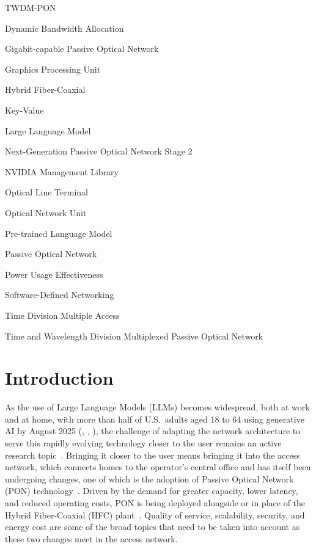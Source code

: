 \documentclass[cic,dipl,english]{infufrgs}
\begin{document}
\begin{listofabbrv}{TWDM-PON}
  \item[DBA] Dynamic Bandwidth Allocation
  \item[G-PON] Gigabit-capable Passive Optical Network
  \item[GPU] Graphics Processing Unit
  \item[HFC] Hybrid Fiber-Coaxial
  \item[KV] Key-Value
  \item[LLM] Large Language Model
  \item[NG-PON2] Next-Generation Passive Optical Network Stage 2
  \item[NVML] NVIDIA Management Library
  \item[OLT] Optical Line Terminal
  \item[ONU] Optical Network Unit
  \item[PLM] Pre-trained Language Model
  \item[PON] Passive Optical Network
  \item[PUE] Power Usage Effectiveness
  \item[SDN] Software-Defined Networking
  \item[TDMA] Time Division Multiple Access
  \item[TWDM-PON] Time and Wavelength Division Multiplexed Passive Optical Network
\end{listofabbrv}

\chapter{Introduction}
\label{chap:introduction}

As the use of Large Language Models (LLMs) becomes widespread, both at work and at
home, with more than half of U.S.\ adults aged 18 to 64 using
generative AI by August 2025 (\citeauthor{bick2025state}, \citeyear{bick2025state}, \citeyear{bick2026rapid}), the challenge of adapting the network architecture to serve
this rapidly evolving technology closer to the user remains an active research
topic~\cite{chen2026network}. Bringing it closer to the user means bringing it into the access
network, which connects homes to the operator's central office and has itself been undergoing
changes, one of which is the adoption of Passive Optical Network (PON)
technology~\cite{effenberger2007introduction}. Driven by the demand for greater capacity,
lower latency, and reduced operating costs, PON is being deployed alongside or in place
of the Hybrid Fiber-Coaxial (HFC) plant~\cite{prodnik2025migration}. Quality of service,
scalability, security, and energy cost are some of the broad topics that need to be taken
into account as these two changes meet in the access network.
\end{document}
